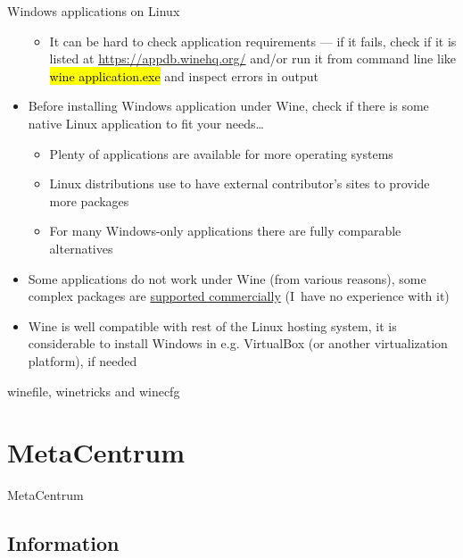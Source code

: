 \documentclass[compress, ucs, xelatex, 11pt, xcolor=svgnames, aspectratio=169,
	hyperref={
		bookmarks=true,
		unicode=true,
		colorlinks=true,
		pdftitle={Linux, command line and MetaCentrum},
		plainpages=false,
		pdfauthor={Vojtech Zeisek},
		pdfsubject={Course about use of Linux command line, writing shell scripts and using MetaCentrum of CESNET},
		pdfcreator={XeLaTeX},
		pdfkeywords={Linux, GNU, BASH, shell, command line, MetaCentrum},
		linkcolor=DarkRed, %
		anchorcolor=DarkBlue, %
		citecolor=Indigo, %
		filecolor=NavyBlue, %
		menucolor=DarkMagenta, %
		urlcolor=DarkBlue, %
		pdftex},
	url={hyphens, lowtilde} %
	]{beamer}
\renewcommand{\texttt}[1]{\hl{\ttfamily #1}}
\begin{document}
\begin{frame}[allowframebreaks]{Windows applications on Linux}
\begin{itemize}
\begin{itemize}
			\item It can be hard to check application requirements --- if it fails, check if it is listed at \url{https://appdb.winehq.org/} and/or run it from command line like \texttt{wine application.exe} and inspect errors in output
		\end{itemize}
		\item Before installing Windows application under Wine, check if there is some native Linux application to fit your needs\ldots
		\begin{itemize}
			\item Plenty of applications are available for more operating systems
			\item Linux distributions use to have external contributor's sites to provide more packages
			\item For many Windows-only applications there are fully comparable alternatives
		\end{itemize}
		\item Some applications do not work under Wine (from various reasons), some complex packages are \href{https://www.codeweavers.com/}{supported commercially} (I~have no experience with it)
		\item Wine is well compatible with rest of the Linux hosting system, it is considerable to install Windows in e.g. VirtualBox (or another virtualization platform), if needed
	\end{itemize}
\end{frame}

\begin{frame}{winefile, winetricks and winecfg}
	\begin{center}
		\texttt{[image: wine.png]}
	\end{center}
\end{frame}

\section{MetaCentrum}

\begin{frame}{MetaCentrum}
	\tableofcontents[currentsection, sectionstyle=show/hide, hideothersubsections]
\end{frame}

\subsection{Information}
\end{document}

